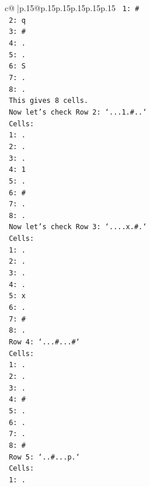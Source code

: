 \documentclass{article}
\begin{document}
{\begin{supertabular}{c@{$\;$}|p{.15\linewidth}@{}p{.15\linewidth}p{.15\linewidth}p{.15\linewidth}p{.15\linewidth}p{.15\linewidth}}
{{{\texttt{   1: \#} \\
\texttt{   2: q} \\
\texttt{   3: \#} \\
\texttt{   4: .} \\
\texttt{   5: .} \\
\texttt{   6: S} \\
\texttt{   7: .} \\
\texttt{   8: .} \\
\texttt{   This gives 8 cells.} \\
\texttt{   Now let's check Row 2: `...1.\#..`} \\
\texttt{   Cells:} \\
\texttt{   1: .} \\
\texttt{   2: .} \\
\texttt{   3: .} \\
\texttt{   4: 1} \\
\texttt{   5: .} \\
\texttt{   6: \#} \\
\texttt{   7: .} \\
\texttt{   8: .} \\
\texttt{   Now let's check Row 3: `....x.\#.`} \\
\texttt{   Cells:} \\
\texttt{   1: .} \\
\texttt{   2: .} \\
\texttt{   3: .} \\
\texttt{   4: .} \\
\texttt{   5: x} \\
\texttt{   6: .} \\
\texttt{   7: \#} \\
\texttt{   8: .} \\
\texttt{   Row 4: `...\#...\#`} \\
\texttt{   Cells:} \\
\texttt{   1: .} \\
\texttt{   2: .} \\
\texttt{   3: .} \\
\texttt{   4: \#} \\
\texttt{   5: .} \\
\texttt{   6: .} \\
\texttt{   7: .} \\
\texttt{   8: \#} \\
\texttt{   Row 5: `..\#...p.`} \\
\texttt{   Cells:} \\
\texttt{   1: .} \\
}}}
\end{supertabular}}
\end{document}
